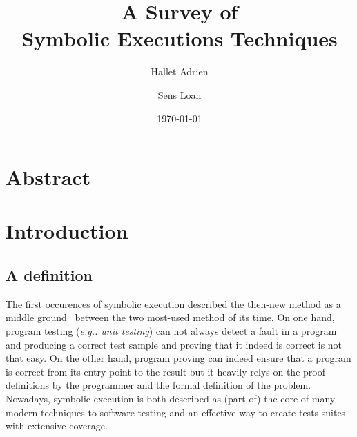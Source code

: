 \documentclass[11pt]{article}
\begin{document}
\title{A Survey of\\Symbolic Executions Techniques} %
\author{Hallet Adrien \and Sens Loan}
\date{\today}
\maketitle

  \section*{Abstract}

  \section{Introduction}
    \subsection{A definition}
      The first occurences of symbolic execution described the then-new method as a middle ground~\cite{newapproach} between the two most-used method of its time. On one hand, program testing (\emph{e.g.: unit testing}) can not always detect a fault in a program and producing a correct test sample and proving that it indeed is correct is not that easy. On the other hand, program proving can indeed ensure that a program is correct from its entry point to the result but it heavily relys on the proof definitions by the programmer and the formal definition of the problem.\\
      Nowadays, symbolic execution is both described as (part of) the core of many modern techniques to software testing\cite{chopper:icse18} and an effective way to create tests suites with extensive coverage.\cite{threedecadeslater}
\end{document}
